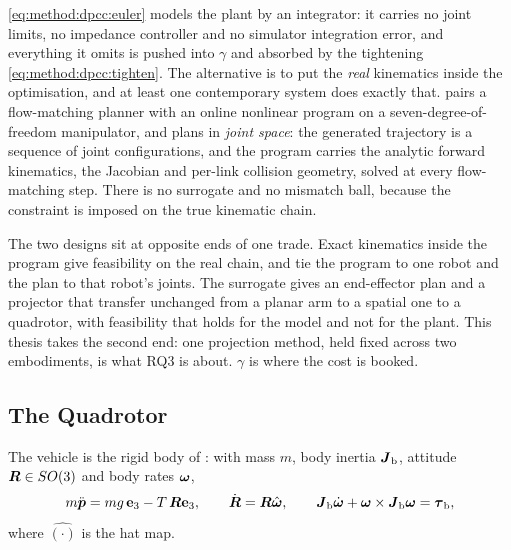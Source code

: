 \begin{remark}\label{rem:eulermodel}
\eqref{eq:method:dpcc:euler} models the plant by an integrator: it carries no joint limits, no
impedance controller and no simulator integration error, and everything it omits is pushed into
$\gamma$ and absorbed by the tightening \eqref{eq:method:dpcc:tighten}. The alternative is to put the
\emph{real} kinematics inside the optimisation, and at least one contemporary system does exactly that.
\parencite{oelerich2026safeflowmpc} pairs a flow-matching planner with an online nonlinear program on
a seven-degree-of-freedom manipulator, and plans in \emph{joint space}: the generated trajectory is a
sequence of joint configurations, and the program carries the analytic forward kinematics, the
Jacobian and per-link collision geometry, solved at every flow-matching step. There is no surrogate
and no mismatch ball, because the constraint is imposed on the true kinematic chain.

The two designs sit at opposite ends of one trade. Exact kinematics inside the program give
feasibility on the real chain, and tie the program to one robot and the plan to that robot's joints.
The surrogate gives an end-effector plan and a projector that transfer unchanged from a planar arm to
a spatial one to a quadrotor, with feasibility that holds for the model and not for the plant. This
thesis takes the second end: one projection method, held fixed across two embodiments, is what RQ3 is about.
$\gamma$ is where the cost is booked.
\end{remark}

\subsection{The Quadrotor}\label{sec:method:quadrotor}

The vehicle is the rigid body of \parencite[Eqs.~(2)--(5)]{lee2010geometric}: with mass $m$, body
inertia $\boldsymbol{J}_{\textrm{b}}$, attitude $\boldsymbol{R}\in SO(3)$ and body rates $\boldsymbol{\omega}$,
\begin{equation}\label{eq:method:dep:plant}
  m\ddot{\boldsymbol{p}} = m g\,\textbf{e}_{3} - T\,\boldsymbol{R}\textbf{e}_{3},
  \qquad
  \dot{\boldsymbol{R}} = \boldsymbol{R}\hat{\boldsymbol{\omega}},
  \qquad
  \boldsymbol{J}_{\textrm{b}}\dot{\boldsymbol{\omega}} + \boldsymbol{\omega}\times\boldsymbol{J}_{\textrm{b}}\boldsymbol{\omega} = \boldsymbol{\tau}_{\textrm{b}},
\end{equation}
where $\hat{(\cdot)}$ is the hat map.

